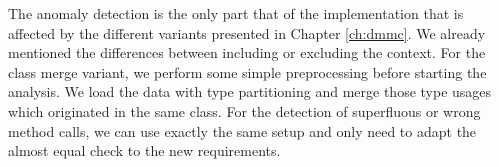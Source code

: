 The anomaly detection is the only part that of the implementation that is affected by the different variants presented in Chapter \ref{ch:dmmc}.
We already mentioned the differences between including or excluding the context.
For the class merge variant, we perform some simple preprocessing before starting the analysis.
We load the data with type partitioning and merge those type usages which originated in the same class.
For the detection of superfluous or wrong method calls, we can use exactly the same setup and only need to adapt the almost equal check to the new requirements.

